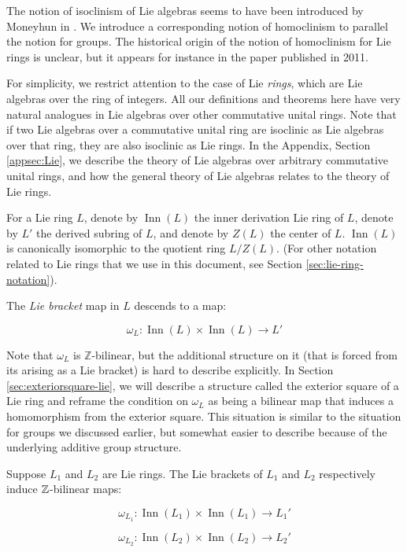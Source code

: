 The notion of isoclinism of Lie algebras seems to have been introduced
by Moneyhun in \cite{Moneyhun}. We introduce a corresponding notion of
homoclinism to parallel the notion for groups. The historical origin
of the notion of homoclinism for Lie rings is unclear, but it appears
for instance in the paper \cite{Moghaddametal} published in 2011.

For simplicity, we restrict attention to the case of Lie {\em rings},
which are Lie algebras over the ring of integers. All our definitions
and theorems here have very natural analogues in Lie algebras over
other commutative unital rings. Note that if two Lie algebras over a
commutative unital ring are isoclinic as Lie algebras over that ring,
they are also isoclinic as Lie rings. In the Appendix, Section
\ref{appsec:Lie}, we describe the theory of Lie algebras over
arbitrary commutative unital rings, and how the general theory of Lie
algebras relates to the theory of Lie rings.

For a Lie ring $L$, denote by $\operatorname{Inn}(L)$ the inner
derivation Lie ring of $L$, denote by $L'$ the derived subring of $L$,
and denote by $Z(L)$ the center of $L$. $\operatorname{Inn}(L)$ is
canonically isomorphic to the quotient ring $L/Z(L)$. (For other
notation related to Lie rings that we use in this document, see
Section \ref{sec:lie-ring-notation}).

The {\em Lie bracket} map in $L$ descends to a map:

$$\omega_L: \operatorname{Inn}(L) \times \operatorname{Inn}(L) \to L'$$

Note that $\omega_L$ is $\mathbb{Z}$-bilinear, but the additional
structure on it (that is forced from its arising as a Lie bracket) is
hard to describe explicitly. In Section \ref{sec:exteriorsquare-lie},
we will describe a structure called the exterior square of a Lie ring
and reframe the condition on $\omega_L$ as being a bilinear map that
induces a homomorphism from the exterior square. This situation is
similar to the situation for groups we discussed earlier, but somewhat
easier to describe because of the underlying additive group structure.

Suppose $L_1$ and $L_2$ are Lie rings. The Lie brackets of $L_1$ and
$L_2$ respectively induce $\mathbb{Z}$-bilinear maps:

$$\omega_{L_1}: \operatorname{Inn}(L_1) \times \operatorname{Inn}(L_1) \to L_1'$$

$$\omega_{L_2}: \operatorname{Inn}(L_2) \times \operatorname{Inn}(L_2) \to L_2'$$

